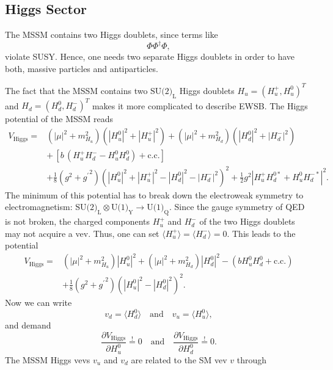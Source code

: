 \documentclass[a4paper,12pt]{book}
\begin{document}
\subsection{Higgs Sector}
The MSSM contains two Higgs doublets, since terms like 
\begin{equation}
\Phi \Phi^\dagger \Phi,
\end{equation} 
violate SUSY. Hence, one needs two separate Higgs doublets in order to have both, massive particles and antiparticles.\par
The fact that the MSSM contains two $\text{SU(2)}_\text{L}$ Higgs doublets $H_u= (H_u^+, H_u^0)^T$ and $H_d = (H_d^0, H_d^-)^T$ makes it more complicated to describe EWSB. The Higgs potential of the MSSM reads \cite{martinSUSY}
\begin{align}
V_\text{Higgs} ={}&
(|\mu|^2 + m^2_{H_u}) (|H_u^0|^2 + |H_u^+|^2)
+ (|\mu|^2 + m^2_{H_d}) (|H_d^0|^2 + |H_d^-|^2)
\nonumber \\
&+\, [b\, (H_u^+ H_d^- - H_u^0 H_d^0) + \text{c.c.}]
\nonumber \\
&+ \frac{1}{8} (g^2 + {g^\prime}^2)
(|H_u^0|^2 + |H_u^+|^2 - |H_d^0|^2 - |H_d^-|^2 )^2
+ \frac{1}{2} g^2 |H_u^+ H_d^{0*} + H_u^0 H_d^{-*}|^2 .
\end{align}
The minimum of this potential has to break down the electroweak symmetry to electromagnetism: $\text{SU(2)}_{ \text{L}} \otimes \text{U(1)}_{ \text{Y}} \rightarrow \text{U(1)}_{ \text{Q}}$. Since the gauge symmetry of QED is not broken, the charged components $H_u^+$ and $H_d^-$ of the two Higgs doublets may not acquire a vev. Thus, one can set $\langle H_u^+\rangle=\langle H_d^-\rangle=0$. This leads to the potential 
\begin{align}
\label{eq::MSSMHiggspot}
V_\text{Higgs} ={}&
(|\mu|^2 + m^2_{H_u}) |H_u^0|^2 
+ (|\mu|^2 + m^2_{H_d}) |H_d^0|^2
- (b H_u^0 H_d^0 + \text{c.c.})
\nonumber \\
&+ \frac{1}{8} (g^2 + {g^\prime}^2)
(|H_u^0|^2 - |H_d^0|^2)^2.
\end{align}
Now we can write 
\begin{equation}
v_d = \langle H_d^0\rangle \quad \text{and} \quad v_u = \langle H_u^0\rangle,
\end{equation}
and demand
\begin{equation}
\label{eq::MSSMHiggspotMin}
\frac{\partial V_\text{Higgs}}{\partial H_u^0} \stackrel{!}{=} 0 \quad \text{and} \quad 
\frac{\partial V_\text{Higgs}}{\partial H_d^0} \stackrel{!}{=} 0.
\end{equation}
The MSSM Higgs vevs $v_u$ and $v_d$ are related to the SM vev $v$ through 
\end{document}
